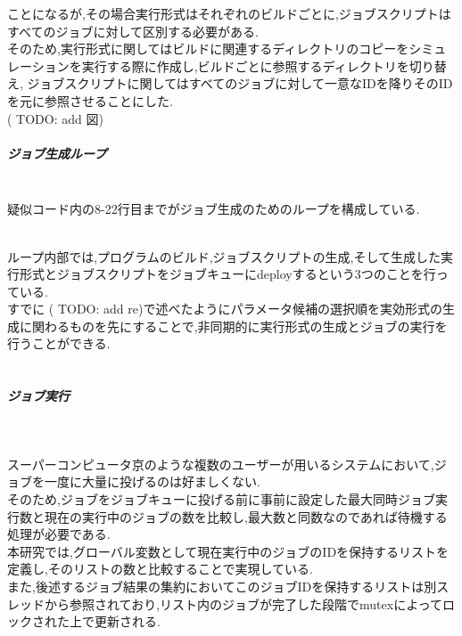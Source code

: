 ことになるが,その場合実行形式はそれぞれのビルドごとに,ジョブスクリプトはすべてのジョブに対して区別する必要がある.\\
そのため,実行形式に関してはビルドに関連するディレクトリのコピーをシミュレーションを実行する際に作成し,ビルドごとに参照するディレクトリを切り替え,
ジョブスクリプトに関してはすべてのジョブに対して一意なIDを降りそのIDを元に参照させることにした.\\
( TODO: add 図)
\subparagraph{ジョブ生成ループ}~\\
疑似コード内の8-22行目までがジョブ生成のためのループを構成している.\\
{\footnotesize

}
~\\
ループ内部では,プログラムのビルド,ジョブスクリプトの生成,そして生成した実行形式とジョブスクリプトをジョブキューにdeployするという3つのことを行っている.\\
すでに ( TODO: add re)で述べたようにパラメータ候補の選択順を実効形式の生成に関わるものを先にすることで,非同期的に実行形式の生成とジョブの実行を行うことができる.\\
~\\
\subparagraph{ジョブ実行}~\\
{\footnotesize

}
スーパーコンピュータ京のような複数のユーザーが用いるシステムにおいて,ジョブを一度に大量に投げるのは好ましくない.\\
そのため,ジョブをジョブキューに投げる前に事前に設定した最大同時ジョブ実行数と現在の実行中のジョブの数を比較し,最大数と同数なのであれば待機する処理が必要である.\\
本研究では,グローバル変数として現在実行中のジョブのIDを保持するリストを定義し,そのリストの数と比較することで実現している.\\
また,後述するジョブ結果の集約においてこのジョブIDを保持するリストは別スレッドから参照されており,リスト内のジョブが完了した段階でmutexによってロックされた上で更新される.\\
